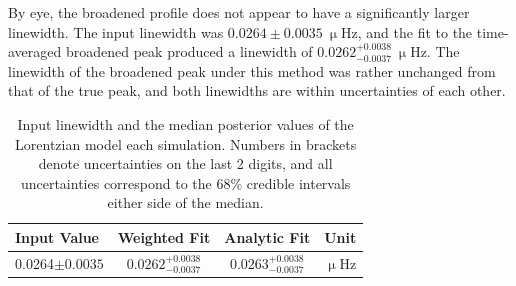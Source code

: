 By eye, the broadened profile does not appear to have a significantly larger linewidth. The input linewidth was $0.0264\pm0.0035~\upmu\mathrm{Hz}$, and the fit to the time-averaged broadened peak produced a linewidth of $0.0262^{+0.0038}_{-0.0037}~\upmu\mathrm{Hz}$. The linewidth of the broadened peak under this method was rather unchanged from that of the true peak, and both linewidths are within uncertainties of each other.

\vspace{1em}

\begin{table}[!ht]
	\begin{center}
		\caption{Input linewidth and the median posterior values of the Lorentzian model each simulation. Numbers in brackets denote uncertainties on the last 2 digits, and all uncertainties correspond to the 68\% credible intervals either side of the median.}
		\label{tab:shift_params}
		\begin{tabular}{l c c r}
			\hline
			{\bf Input Value} & {\bf Weighted Fit} & {\bf Analytic Fit} & {\bf Unit} \\
			\hline
			
			
			{0.0264$\pm0.0035$} & {$0.0262^{+0.0038}_{-0.0037}$} & {$0.0263^{+0.0038}_{-0.0037}$} & {$\upmu\mathrm{Hz} $} \\
			
			
			\hline
		\end{tabular}
	\end{center}
\end{table}


